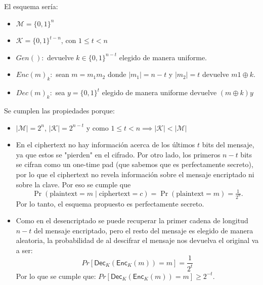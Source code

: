 \documentclass[12pt,addpoints,answers]{exam}
\begin{document}
\begin{questions}
\begin{solution} 
    El esquema sería:
    \begin{itemize}
        \item $\mathcal{M} = \{0,1\}^{n}$
        \item $\mathcal{K} = \{0,1\}^{t-n}$, con $1 \leq t < n$
        \item $Gen():$ devuelve $k \in \{0,1\}^{n-t}$ elegido de manera uniforme.
        \item $Enc(m)_k:$ sean $m = m_1m_2$ donde $|m_1| = n-t$ y $|m_2| = t$ devuelve $m1 \oplus k$.
        \item $Dec(m)_k:$ sea $y = \{0,1\}^t$ elegido de manera uniforme devuelve $(m \oplus k)y$
    \end{itemize}
    Se cumplen las propiedades porque: 
    \begin{itemize}
        \item $|\mathcal{M}| = 2^n$, $|\mathcal{K}| = 2^{n-t}$ y como $1 \leq t < n \implies |\mathcal{K}| < |\mathcal{M}|$
        \item En el ciphertext no hay información acerca de los últimos $t$ bits del mensaje, ya que estos se "pierden" en el cifrado. 
        Por otro lado, los primeros $n-t$ bits se cifran como un one-time pad (que sabemos que es perfectamente secreto), por lo que el ciphertext no revela información sobre el mensaje encriptado ni sobre la clave. Por eso se cumple que
        \[
        \Pr(\text{plaintext}=m \mid \text{ciphertext}=c)=\Pr(\text{plaintext}=m)=\tfrac{1}{2^n}.
        \]
        Por lo tanto, el esquema propuesto es perfectamente secreto.
        \item Como en el desencriptado se puede recuperar la primer cadena de longitud $n-t$ del mensaje encriptado, pero el resto del mensaje es elegido de manera aleatoria, la probabilidad de al descifrar el mensaje nos devuelva el original va a ser: 
        \[
        Pr[\mathsf{Dec}_K(\mathsf{Enc}_K(m)) = m] = \frac{1}{2^t}
        \]
        Por lo que se cumple que: $Pr[\mathsf{Dec}_K(\mathsf{Enc}_K(m)) = m] \geq 2^{-t}$.
    \end{itemize}
\end{solution}

\end{questions}
\end{document}
